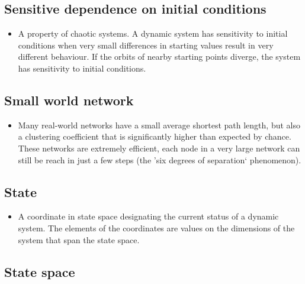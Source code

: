 \documentclass[12pt,]{book}
\providecommand{\tightlist}{%
  \setlength{\itemsep}{0pt}\setlength{\parskip}{0pt}}
\begin{document}
\hypertarget{Sens67}{%
\subsection*{\texorpdfstring{\textbf{Sensitive dependence on initial conditions}}{Sensitive dependence on initial conditions}}\label{Sens67}}

\begin{itemize}
\tightlist
\item
  A property of chaotic systems. A dynamic system has sensitivity to initial conditions when very small differences in starting values result in very different behaviour. If the orbits of nearby starting points diverge, the system has sensitivity to initial conditions.
\end{itemize}

\hypertarget{Smal68}{%
\subsection*{\texorpdfstring{\textbf{Small world network}}{Small world network}}\label{Smal68}}

\begin{itemize}
\tightlist
\item
  Many real-world networks have a small average shortest path length, but also a clustering coefficient that is significantly higher than expected by chance. These networks are extremely efficient, each node in a very large network can still be reach in just a few steps (the 'six degrees of separation` phenomenon).
\end{itemize}

\hypertarget{Stat69}{%
\subsection*{\texorpdfstring{\textbf{State}}{State}}\label{Stat69}}

\begin{itemize}
\tightlist
\item
  A coordinate in state space designating the current status of a dynamic system. The elements of the coordinates are values on the dimensions of the system that span the state space.
\end{itemize}

\hypertarget{Stat70}{%
\subsection*{\texorpdfstring{\textbf{State space}}{State space}}\label{Stat70}}
\end{document}

